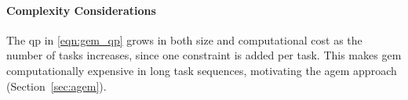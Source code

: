 \paragraph{Complexity Considerations}

The \gls{qp}  in \eqref{eqn:gem_qp} grows in both size and computational cost as
the number of tasks increases, since one constraint is added per task. This
makes \gls{gem} computationally expensive in long task sequences, motivating the \gls{agem} approach (Section~\ref{sec:agem}).

